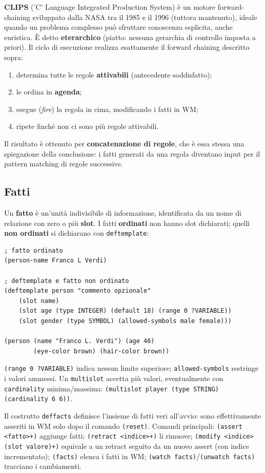 \documentclass[a4paper,11pt]{article}
\begin{document}
\textbf{CLIPS} ('C' Language Integrated Production System) è un motore forward-chaining sviluppato dalla NASA tra il 1985 e il 1996 (tuttora mantenuto), ideale quando un problema complesso può sfruttare conoscenza esplicita, anche euristica. È detto \textbf{eterarchico} (piatto: nessuna gerarchia di controllo imposta a priori). Il ciclo di esecuzione realizza esattamente il forward chaining descritto sopra:
\begin{enumerate}
  \item determina tutte le regole \textbf{attivabili} (antecedente soddisfatto);
  \item le ordina in \textbf{agenda};
  \item esegue (\emph{fire}) la regola in cima, modificando i fatti in WM;
  \item ripete finché non ci sono più regole attivabili.
\end{enumerate}
Il risultato è ottenuto per \textbf{concatenazione di regole}, che è essa stessa una spiegazione della conclusione: i fatti generati da una regola diventano input per il pattern matching di regole successive.

\subsection{Fatti}

Un \textbf{fatto} è un'unità indivisibile di informazione, identificata da un nome di relazione con zero o più \textbf{slot}. I fatti \textbf{ordinati} non hanno slot dichiarati; quelli \textbf{non ordinati} si dichiarano con \texttt{deftemplate}:
\begin{lstlisting}
; fatto ordinato
(person-name Franco L Verdi)

; deftemplate e fatto non ordinato
(deftemplate person "commento opzionale"
    (slot name)
    (slot age (type INTEGER) (default 18) (range 0 ?VARIABLE))
    (slot gender (type SYMBOL) (allowed-symbols male female)))

(person (name "Franco L. Verdi") (age 46)
        (eye-color brown) (hair-color brown))
\end{lstlisting}
\texttt{(range 0 ?VARIABLE)} indica nessun limite superiore; \texttt{allowed-symbols} restringe i valori ammessi. Un \texttt{multislot} accetta più valori, eventualmente con \texttt{cardinality} minima/massima: \texttt{(multislot player (type STRING) (cardinality 6 6))}.

Il costrutto \texttt{deffacts} definisce l'insieme di fatti veri all'avvio: sono effettivamente asseriti in WM solo dopo il comando \texttt{(reset)}. Comandi principali: \texttt{(assert <fatto>+)} aggiunge fatti; \texttt{(retract <indice>+)} li rimuove; \texttt{(modify <indice> (slot valore)+)} equivale a un retract seguito da un nuovo assert (con indice incrementato); \texttt{(facts)} elenca i fatti in WM; \texttt{(watch facts)}/\texttt{(unwatch facts)} tracciano i cambiamenti.
\end{document}

